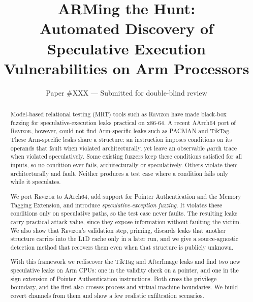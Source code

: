 \documentclass[letterpaper,twocolumn,10pt]{article}
\makeatletter
\theoremstyle{definition}
\def\uarch@bold#1#2\@nil{\if b#1\boldmath\fi}
\DeclareRobustCommand{\uarch}{{\expandafter\uarch@bold\f@series\@nil\ensuremath{\mu}}arch\xspace}
\makeatother
\begin{document}
\date{}

\title{\Large \bf 
ARMing the Hunt:\\
  Automated Discovery of Speculative Execution\\ Vulnerabilities on Arm Processors}

\author{
{\rm Paper \#XXX --- Submitted for double-blind review}\\
}

\maketitle


\begin{abstract}
Model-based relational testing (MRT) tools such as \textsc{Revizor} have made black-box fuzzing for
speculative-execution leaks practical on x86-64. A recent AArch64 port of \textsc{Revizor}, however,
could not find Arm-specific leaks such as PACMAN and TikTag. These Arm-specific leaks share a
structure: an instruction imposes conditions on its operands that fault when violated
architecturally, yet leave an observable \uarch trace when violated speculatively. Some existing
fuzzers keep these conditions satisfied for all inputs, so no condition ever fails, architecturally
or speculatively. Others violate them architecturally and fault. Neither produces a test case where
a condition fails only while it speculates.

We port \textsc{Revizor} to AArch64, add support for Pointer Authentication and the Memory Tagging
Extension, and introduce \emph{speculative-exception fuzzing}. It violates these conditions only on
speculative paths, so the test case never faults. The resulting leaks carry practical attack value,
since they expose information without faulting the victim. We also show that \textsc{Revizor}'s validation
step, priming, discards leaks that another structure carries into the L1D cache only in a later run,
and we give a source-agnostic detection method that recovers them even when that structure is
publicly unknown.

With this framework we rediscover the TikTag and AfterImage leaks and find two new speculative leaks
on Arm CPUs: one in the validity check on a pointer, and one in the sign extension of Pointer
Authentication instructions. Both cross the privilege boundary, and the first also crosses process
and virtual-machine boundaries. We build covert channels from them and show a few realistic
exfiltration scenarios.
\end{abstract}
\end{document}
